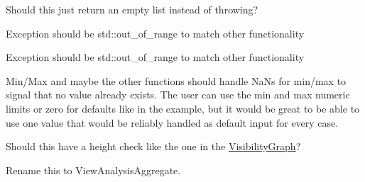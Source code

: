 \begin{DoxyRefList}
%
Should this just return an empty list instead of throwing?  
\item[Member \mbox{\hyperlink{a02005_a556efc898ddc67b64fff560d0c7b5a0a}{HF\+::Spatial\+Structures\+::Node\+::operator\mbox{[}\mbox{]}}} (int i)]\label{a00386__todo000028}%
%
Exception should be std\+::out\+\_\+of\+\_\+range to match other functionality 
\item[Member \mbox{\hyperlink{a02005_ae3e88bd4eecfdbd93431953ed07b8a7b}{HF\+::Spatial\+Structures\+::Node\+::operator\mbox{[}\mbox{]}}} (int i) const]\label{a00386__todo000029}%
%
Exception should be std\+::out\+\_\+of\+\_\+range to match other functionality 
\item[Member \mbox{\hyperlink{a00400_a38c197b654c753cb656ab60e88d65120}{HF\+::View\+Analysis\+::Aggregate}} (float \&out\+\_\+total, float new\+\_\+value, const AGGREGATE\+\_\+\+TYPE agg\+\_\+type, int count=0)]\label{a00386__todo000003}%
%
Min/\+Max and maybe the other functions should handle Na\+Ns for min/max to signal that no value already exists. The user can use the min and max numeric limits or zero for defaults like in the example, but it would be great to be able to use one value that would be reliably handled as default input for every case.  
\item[Member \mbox{\hyperlink{a00393_ga78f77d24531d0fa55c9b60d7ec1bf32a}{HF\+::View\+Analysis\+::Spherical\+Rayshoot\+With\+Any\+RTFor\+Distance}} (RT \&ray\+\_\+tracer, const std\+::vector$<$ N $>$ \&Nodes, int num\+\_\+rays, float upward\+\_\+limit=50.\+0f, float downward\+\_\+limit=70.\+0f, float height=1.\+7f, const AGGREGATE\+\_\+\+TYPE aggregation=\mbox{\hyperlink{a00400_a1fcaa17d2a8df8896a3b0447973bd07ba6970bdc2201030b9c03fbdcf3973858a}{AGGREGATE\+\_\+\+TYPE\+::\+SUM}})]\label{a00386__todo000005}%
%
Should this have a height check like the one in the \mbox{\hyperlink{a00401}{Visibility\+Graph}}?

\label{a00386__todo000006}%
%
Rename this to View\+Analysis\+Aggregate.


\end{DoxyRefList}
